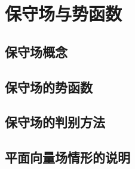 \section{保守场与势函数}
\subsection{保守场概念}
\subsection{保守场的势函数}
\subsection{保守场的判别方法}
\subsection{平面向量场情形的说明}
